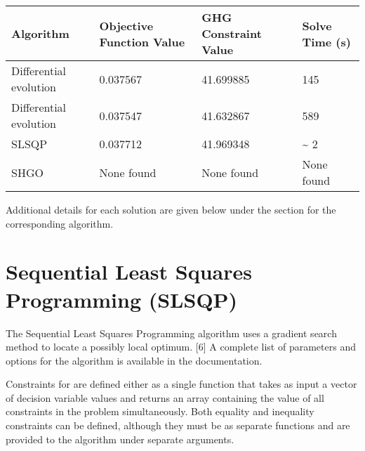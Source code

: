 \documentclass[letterpaper,10pt,english]{sphinxmanual}
\begin{document}
\begin{savenotes}\sphinxattablestart
\centering
{}
\sphinxthecaptionisattop
{}\label{\detokenize{optimizers:table-1}}\label{\detokenize{optimizers:tbl-algoperformance}}
\sphinxaftertopcaption
\begin{tabulary}{\linewidth}[t]{|T|T|T|T|}
\hline
\sphinxstyletheadfamily 
Algorithm
&\sphinxstyletheadfamily 
Objective Function Value
&\sphinxstyletheadfamily 
GHG Constraint Value
&\sphinxstyletheadfamily 
Solve Time (s)
\\
\hline
Differential evolution
&
0.037567
&
41.699885
&
145
\\
\hline
Differential evolution
&
0.037547
&
41.632867
&
589
\\
\hline
SLSQP
&
0.037712
&
41.969348
&
\textasciitilde{} 2
\\
\hline
SHGO
&
None found
&
None found
&
None found
\\
\hline
\end{tabulary}
\par
\sphinxattableend\end{savenotes}

Additional details for each solution are given below under the section for the corresponding algorithm.


\section{Sequential Least Squares Programming (SLSQP)}
\label{\detokenize{optimizers:sequential-least-squares-programming-slsqp}}
The Sequential Least Squares Programming algorithm uses a gradient search method to locate a possibly local optimum. {[}6{]} A complete list of parameters and options for the  algorithm is available in the   documentation.

Constraints for  are defined either as a single function that takes as input a vector of decision variable values and returns an array containing the value of all constraints in the problem simultaneously. Both equality and inequality constraints can be defined, although they must be as separate functions and are provided to the  algorithm under separate arguments.
\end{document}
